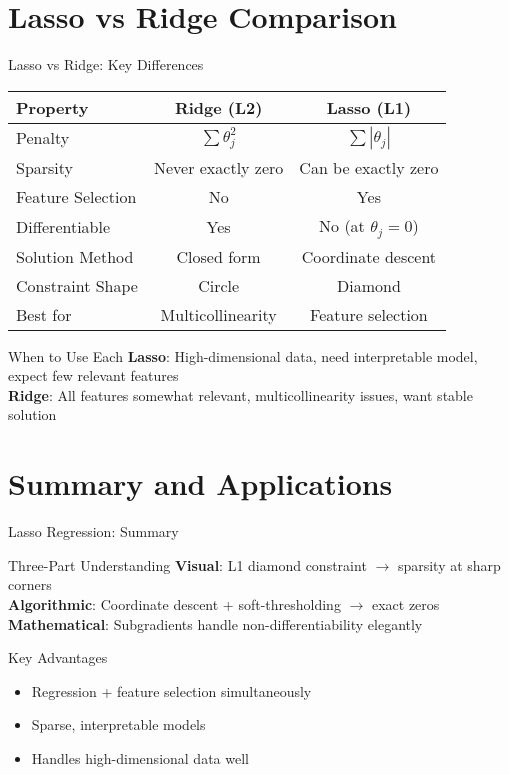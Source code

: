 \documentclass{beamer}
\begin{document}
\section{Lasso vs Ridge Comparison}

\begin{frame}{Lasso vs Ridge: Key Differences}
\begin{table}[h]
\centering
\begin{tabular}{|l|c|c|}
\hline
\textbf{Property} & \textbf{Ridge (L2)} & \textbf{Lasso (L1)} \\
\hline
Penalty & $\sum \theta_j^2$ & $\sum |\theta_j|$ \\
\hline
Sparsity & Never exactly zero & Can be exactly zero \\
\hline
Feature Selection & No & Yes \\
\hline
Differentiable & Yes & No (at $\theta_j = 0$) \\
\hline
Solution Method & Closed form & Coordinate descent \\
\hline
Constraint Shape & Circle & Diamond \\
\hline
Best for & Multicollinearity & Feature selection \\
\hline
\end{tabular}
\end{table}

\begin{keypointsbox}{When to Use Each}
{\small
\textbf{Lasso}: High-dimensional data, need interpretable model, expect few relevant features \\
\textbf{Ridge}: All features somewhat relevant, multicollinearity issues, want stable solution
}
\end{keypointsbox}
\end{frame}

\section{Summary and Applications}

\begin{frame}{Lasso Regression: Summary}
\begin{theorembox}{Three-Part Understanding}
\textbf{Visual}: L1 diamond constraint $\to$ sparsity at sharp corners \\
\textbf{Algorithmic}: Coordinate descent + soft-thresholding $\to$ exact zeros \\
\textbf{Mathematical}: Subgradients handle non-differentiability elegantly
\end{theorembox}

\begin{keypointsbox}{Key Advantages}
{\small
\begin{itemize}
\item Regression + feature selection simultaneously
\item Sparse, interpretable models
\item Handles high-dimensional data well
\end{itemize}
}
\end{keypointsbox}
\end{frame}
\end{document}
